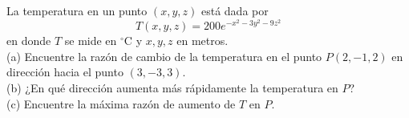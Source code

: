 \item La temperatura en un punto $(x, y, z)$ está dada por
\[ T(x, y, z) = 200e^{-x^2 - 3y^2 - 9z^2} \]
en donde $T$ se mide en $^\circ\text{C}$ y $x, y, z$ en metros. \\
(a) Encuentre la razón de cambio de la temperatura en el punto $P(2, -1, 2)$ en dirección hacia el punto $(3, -3, 3)$. \\
(b) ¿En qué dirección aumenta más rápidamente la temperatura en $P$? \\
(c) Encuentre la máxima razón de aumento de $T$ en $P$.
